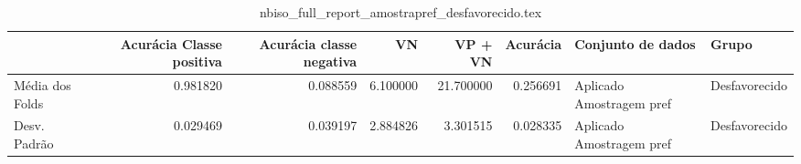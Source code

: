 \begin{table}
\centering
\caption{nbiso_full_report_amostrapref_desfavorecido.tex}
\label{nbiso_full_report_amostrapref_desfavorecido.tex}
\begin{tabular}{lrrrrrll}
\toprule
{}              &  Acurácia Classe positiva &  Acurácia classe negativa &       VN  &   VP + VN  &  Acurácia &         Conjunto de dados &          Grupo \\
\midrule
Média dos Folds &                  0.981820 &                  0.088559 &  6.100000 &  21.700000 &  0.256691 &  Aplicado Amostragem pref &  Desfavorecido \\
Desv. Padrão    &                  0.029469 &                  0.039197 &  2.884826 &   3.301515 &  0.028335 &  Aplicado Amostragem pref &  Desfavorecido \\
\bottomrule
\end{tabular}
\end{table}
